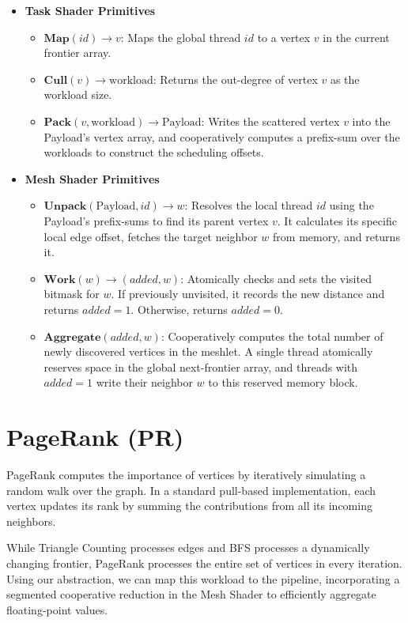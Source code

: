 \documentclass[11pt, a4paper]{article}
\begin{document}
\begin{itemize}
    \item \textbf{Task Shader Primitives}
    \begin{itemize}
        \item $\textbf{Map}(id) \rightarrow v$: Maps the global thread $id$ to a vertex $v$ in the current frontier array.
        \item $\textbf{Cull}(v) \rightarrow \text{workload}$: Returns the out-degree of vertex $v$ as the workload size.
        \item $\textbf{Pack}(v, \text{workload}) \rightarrow \text{Payload}$: Writes the scattered vertex $v$ into the Payload's vertex array, and cooperatively computes a prefix-sum over the workloads to construct the scheduling offsets.
    \end{itemize}
    \item \textbf{Mesh Shader Primitives}
    \begin{itemize}
        \item $\textbf{Unpack}(\text{Payload}, id) \rightarrow w$: Resolves the local thread $id$ using the Payload's prefix-sums to find its parent vertex $v$. It calculates its specific local edge offset, fetches the target neighbor $w$ from memory, and returns it.
        \item $\textbf{Work}(w) \rightarrow (added, w)$: Atomically checks and sets the visited bitmask for $w$. If previously unvisited, it records the new distance and returns $added = 1$. Otherwise, returns $added = 0$.
        \item $\textbf{Aggregate}(added, w)$: Cooperatively computes the total number of newly discovered vertices in the meshlet. A single thread atomically reserves space in the global next-frontier array, and threads with $added = 1$ write their neighbor $w$ to this reserved memory block.
    \end{itemize}
\end{itemize}


\section{PageRank (PR)}

PageRank computes the importance of vertices by iteratively simulating a random walk over the graph. In a standard pull-based implementation, each vertex updates its rank by summing the contributions from all its incoming neighbors. 

While Triangle Counting processes edges and BFS processes a dynamically changing frontier, PageRank processes the entire set of vertices in every iteration. Using our abstraction, we can map this workload to the pipeline, incorporating a segmented cooperative reduction in the Mesh Shader to efficiently aggregate floating-point values.
\end{document}
